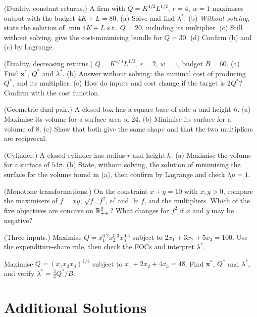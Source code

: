 \begin{problems}
  \item (Duality, constant returns.) A firm with $Q=K^{1/2}L^{1/2}$,
        $r=4$, $w=1$ maximises output with the budget $4K+L=80$.
        (a) Solve and find $\lambda^*$. (b) \emph{Without solving}, state
        the solution of $\min 4K+L$ s.t.\ $Q=20$, including its multiplier.
        (c) Still without solving, give the cost-minimising bundle for
        $Q=30$. (d) Confirm (b) and (c) by Lagrange.
  \item (Duality, decreasing returns.) $Q=K^{1/3}L^{1/3}$, $r=2$, $w=1$,
        budget $B=60$. (a) Find $\mathbf{x}^*$, $Q^*$ and $\lambda^*$.
        (b) Answer without solving: the minimal cost of producing $Q^*$, and
        its multiplier. (c) How do inputs and cost change if the target is
        $2Q^*$? Confirm with the cost function.
  \item (Geometric dual pair.) A closed box has a square base of side $a$
        and height $h$. (a) Maximise its volume for a surface area of $24$.
        (b) Minimise its surface for a volume of $8$. (c) Show that both
        give the same shape and that the two multipliers are reciprocal.
  \item (Cylinder.) A closed cylinder has radius $r$ and height $h$.
        (a) Maximise the volume for a surface of $54\pi$. (b) State, without
        solving, the solution of minimising the surface for the volume found
        in (a), then confirm by Lagrange and check $\lambda\mu=1$.
  \item (Monotone transformations.) On the constraint $x+y=10$ with
        $x,y>0$, compare the maximisers of $f=xy$, $\sqrt{f}$, $f^{2}$,
        $\mathrm{e}^{f}$ and $\ln f$, and the multipliers. Which of the five
        objectives are concave on $\mathbb{R}^{2}_{++}$? What changes for $f^{2}$
        if $x$ and $y$ may be negative?
  \item (Three inputs.) Maximise $Q=x_1^{0.2}x_2^{0.3}x_3^{0.5}$ subject
        to $2x_1+3x_2+5x_3=100$. Use the expenditure-share rule, then check
        the FOCs and interpret $\lambda^*$.
  \item Maximise $Q=(x_1x_2x_3)^{1/4}$ subject to $x_1+2x_2+4x_3=48$.
        Find $\mathbf{x}^*$, $Q^*$ and $\lambda^*$, and verify
        $\lambda^*=\tfrac34Q^*/B$.
\end{problems}

\section{Additional Solutions}

